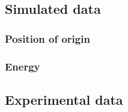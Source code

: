 \subsection{Simulated data}
\subsubsection{Position of origin}

\subsubsection{Energy}


\subsection{Experimental data}

